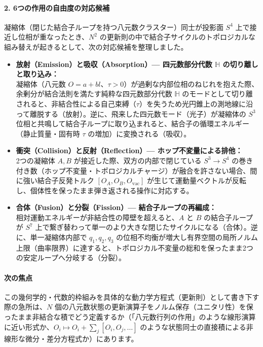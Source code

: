 \documentclass[
  a4paper,
]{ltjsarticle}
\providecommand{\tightlist}{%
  \setlength{\itemsep}{0pt}\setlength{\parskip}{0pt}}
\begin{document}
\paragraph{2.
6つの作用の自由度の対応候補}\label{ux3064ux306eux4f5cux7528ux306eux81eaux7531ux5ea6ux306eux5bfeux5fdcux5019ux88dc}

凝縮体（閉じた結合子ループを持つ八元数クラスター）同士が投影面 \(S^4\)
上で接近し位相が重なったとき、\(N^2\)
の更新則の中で結合子サイクルのトポロジカルな組み替えが起きるとして、次の対応候補を整理しました。

\begin{itemize}
\tightlist
\item
  \textbf{放射（Emission）と吸収（Absorption）--- 四元数部分代数
  \(\mathbb{H}\) の切り離しと取り込み：}\\
  凝縮体（八元数
  \(O = a + bl\)、\(\tau > 0\)）が過剰な内部位相のねじれを抱えた際、余剰分が結合法則を満たす純粋な四元数部分代数
  \(\mathbb{H}\)
  のモードとして切り離されると、非結合性による自己束縛（\(\tau\)）を失うため光円錐上の測地線に沿って離脱する（放射）。逆に、飛来した四元数モード（光子）が凝縮体の
  \(S^3\)
  位相と共鳴して結合子ループに取り込まれると、結合子の循環エネルギー（静止質量・固有時
  \(\tau\) の増加）に変換される（吸収）。
\item
  \textbf{衝突（Collision）と反射（Reflection）---
  ホップ不変量による排他：}\\
  2つの凝縮体 \(A, B\) が接近した際、双方の内部で閉じている
  \(S^3 \to S^4\)
  の巻き付き数（ホップ不変量・トポロジカルチャージ）が融合を許さない場合、間に強い結合子反発トルク
  \([O_A, O_B, O_{\mathrm{vac}}]\)
  が生じて運動量ベクトルが反転し、個体性を保ったまま弾き返される操作に対応する。
\item
  \textbf{合体（Fusion）と分裂（Fission）--- 結合子ループの再編成：}\\
  相対運動エネルギーが非結合性の障壁を超えると、\(A\) と \(B\)
  の結合子ループが \(S^7\)
  上で繋ぎ替わって単一のより大きな閉じたサイクルになる（合体）。逆に、単一凝縮体内部で
  \(q_1, q_2, q_3\)
  の位相不均衡が増大し有界空間の局所ノルム上限（曲率限界）に達すると、トポロジカル不変量の総和を保ったまま2つの安定ループへ分岐する（分裂）。
\end{itemize}

\paragraph{次の焦点}\label{ux6b21ux306eux7126ux70b9}

この幾何学的・代数的枠組みを具体的な動力学方程式（更新則）として書き下す際の急所は、\(N\)
個の八元数状態の更新演算子をノルム保存（ユニタリ性）を保ったまま非結合な積でどう定義するか（「八元数行列の作用」のような線形演算に近い形式か、\(O_i \mapsto O_i + \sum_j [O_i, O_j, \dots]\)
のような状態同士の直接積による非線形な微分・差分方程式か）にあります。
\end{document}
